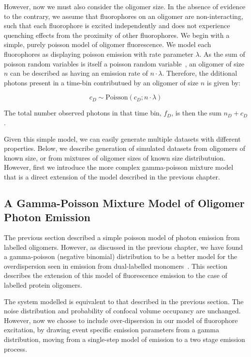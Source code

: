 However, now we must also consider the oligomer size. In the absence of evidence to the contrary, we assume that fluorophores on an oligomer are non-interacting, such that each fluorophore is excited independently and does not experience quenching effects from the proximity of other fluorophores. We begin with a simple, purely poisson model of oligomer fluorescence. We model each fluorophores as displaying poisson emission with rate parameter $\lambda$. As the sum of poisson random variables is itself a poisson random variable~\cite{Lehmann1986}, an oligomer of size $n$ can be described as having an emission rate of $n \cdot \lambda$. Therefore, the dditional photons present in a time-bin contributued by an oligomer of size $n$ is given by:

\begin{equation}
c_D \sim \text{Poisson}(c_D; n \cdot \lambda)
\end{equation} 

The total number observed photons in that time bin, $f_D$, is then the sum $n_D + c_D$.

Given this simple model, we can easily generate multiple datasets with different properties. Below, we describe generation of simulated datasets from oligomers of known size, or from mixtures of oligomer sizes of known size distributuion. However, first we introduce the more complex gamma-poisson mixture model that is a direct extension of the model described in the previous chapter.

\subsection{A Gamma-Poisson Mixture Model of Oligomer Photon Emission}
The previous section described a simple poisson model of photon emission from labelled oligomers. However, as discussed in the previous chapter, we have found a gamma-poisson (negative binomial) distribution to be a better model for the overdispersion seen in emission from dual-labelled monomers~\cite{murphy14}. This section describes the extension of this model of fluorescence emission to the case of labelled protein oligomers.

The system modelled is equivalent to that described in the previous section. The noise distribution and probability of confocal volume occupancy are unchanged. However, now we choose to include over-dipsersion in our model of fluorophore excitation, by drawing event specific emission parameters from a gamma distribution, moving from a single-step model of emission to a two stage emission process. 

